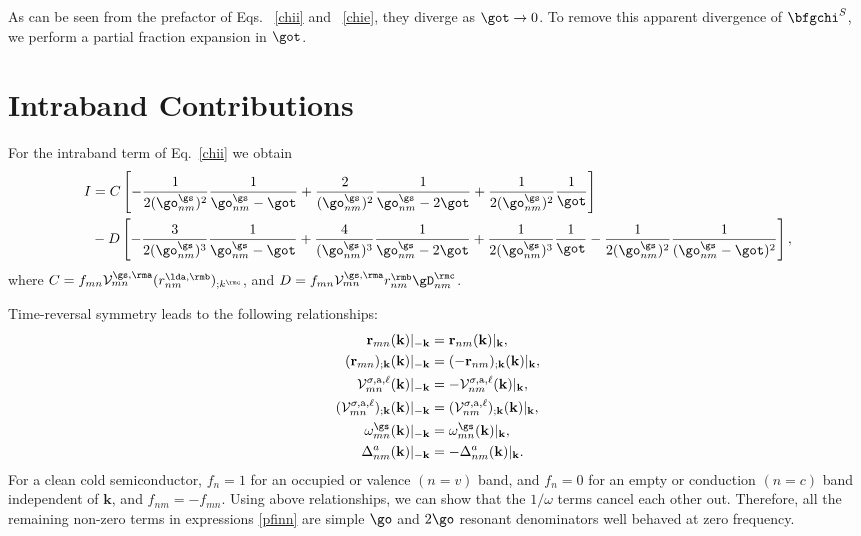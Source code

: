 As can be seen from the prefactor of Eqs. ~\eqref{chii} and
~\eqref{chie}, they 
diverge as $\got\to 0$. To remove this apparent 
divergence of $\bfgchi^S$, we perform
a partial fraction  expansion in $\got$.

\section{Intraband Contributions}

For the intraband term of Eq.~\eqref{chii}
we obtain
\begin{align}\label{pfinn} 
I&= 
C
\left[
-\frac{1}{2(\go^\gs_{nm})^2}\frac{1}{\go^\gs_{nm}-\got}
+\frac{2}{(\go^\gs_{nm})^2}\frac{1}{\go^\gs_{nm}-2\got}
+\frac{1}{2(\go^\gs_{nm})^2}\frac{1}{\got}
\right]
\nonumber\\
&-D
\left[
-\frac{3}{2(\go^\gs_{nm})^3}\frac{1}{\go^\gs_{nm}-\got}
+\frac{4}{(\go^\gs_{nm})^3}\frac{1}{\go^\gs_{nm}-2\got}
+\frac{1}{2(\go^\gs_{nm})^3}\frac{1}{\got}
-\frac{1}{2(\go^\gs_{nm})^2}\frac{1}{(\go^\gs_{nm}-\got)^2}
\right]
,
\end{align} 
where 
$C=f_{mn}{\cal V}^{\gs,\rma}_{mn}(r^{\lda,\rmb}_{nm})_{;k^{\rmc}}$, 
and
$D=f_{mn}{\cal V}^{\gs,\rma}_{mn}r^{\rmb}_{nm}\gD^{\rmc}_{nm}$.

Time-reversal symmetry leads to the following relationships:
\begin{align}\label{time_reversal}
    \mathbf{r}_{mn}(\mathbf{k})|_{-\mathbf{k}}
&=  \mathbf{r}_{nm}(\mathbf{k})|_{\mathbf{k}},\nonumber\\
    (\mathbf{r}_{mn})_{;\mathbf{k}}(\mathbf{k})|_{-\mathbf{k}}
&=  (-\mathbf{r}_{nm})_{;\mathbf{k}}(\mathbf{k})|_{\mathbf{k}},\nonumber\\
    \mathcal{V}^{\sigma,\text{a},\ell}_{mn}(\mathbf{k})|_{-\mathbf{k}}
&=  -\mathbf{\mathcal{V}}_{nm}^{\sigma,\text{a},\ell}(\mathbf{k})|_{\mathbf{k}},
    \nonumber\\
    (\mathcal{V}^{\sigma,\text{a},\ell}_{mn})_{;\mathbf{k}}
    (\mathbf{k})|_{-\mathbf{k}}
&=  (\mathbf{\mathcal{V}}_{nm}^{\sigma,\text{a},\ell})_{;\mathbf{k}}
    (\mathbf{k})|_{\mathbf{k}},\\
    \omega_{mn}^{\gs}(\mathbf{k})|_{-\mathbf{k}}
&=  \omega_{mn}^{\gs}(\mathbf{k})|_{\mathbf{k}},\nonumber\\
    \Delta^a_{nm}(\mathbf{k})|_{-\mathbf{k}}
&=  -\Delta^a_{nm}(\mathbf{k})|_{\mathbf{k}}.\nonumber
\end{align}
For a clean cold semiconductor, $f_{n} = 1$ for an occupied 
or valence $(n = v)$ band, and $f_{n} = 0$ for an empty 
or conduction $(n = c)$ band independent of $\mathbf{k}$, 
and $f_{nm}=-f_{mn}$.
Using above relationships, we can show that 
the $1/\omega$ terms cancel each other out. 
Therefore, all the remaining non-zero terms in expressions \eqref{pfinn}
are simple $\go$ and $2\go$ resonant denominators well behaved at zero
frequency. 

